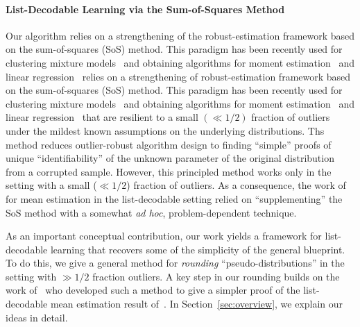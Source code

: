 


\paragraph{List-Decodable Learning via the Sum-of-Squares Method} Our algorithm relies on a strengthening of the robust-estimation framework based on the sum-of-squares (SoS) method. This paradigm has been recently used for clustering mixture models~\cite{HopkinsLi17,KothariSteinhardt17} and obtaining algorithms for moment estimation~\cite{2017KS} and linear regression~\cite{DBLP:conf/colt/KlivansKM18}
 relies on a strengthening of robust-estimation framework based on the sum-of-squares (SoS) method. This paradigm has been recently used for clustering mixture models~\cite{HopkinsLi17,KothariSteinhardt17} and obtaining algorithms for moment estimation~\cite{2017KS} and linear regression~\cite{DBLP:conf/colt/KlivansKM18} that are resilient to a small $(\ll 1/2)$ fraction of outliers under the mildest known assumptions on the underlying distributions. Ths method reduces outlier-robust algorithm design to finding ``simple'' proofs of  unique ``identifiability'' of the unknown parameter of the original distribution from a corrupted sample. However, this principled method works only in the setting with a small ($\ll 1/2$) fraction of outliers. As a consequence, the work of~\cite{KothariSteinhardt17} for mean estimation in the list-decodable setting relied on ``supplementing'' the SoS method with a somewhat \emph{ad hoc}, problem-dependent technique. 

As an important conceptual contribution, our work yields a framework for list-decodable learning that recovers some of the simplicity of the general blueprint. To do this, we give a general method for \emph{rounding} ``pseudo-distributions'' in the setting with $\gg 1/2$ fraction outliers. A key step in our rounding builds on the work of~\cite{KS19} who developed such a method to give a simpler proof of the list-decodable mean estimation result of~\cite{KothariSteinhardt17}. In Section~\ref{sec:overview}, we explain our ideas in detail. 

